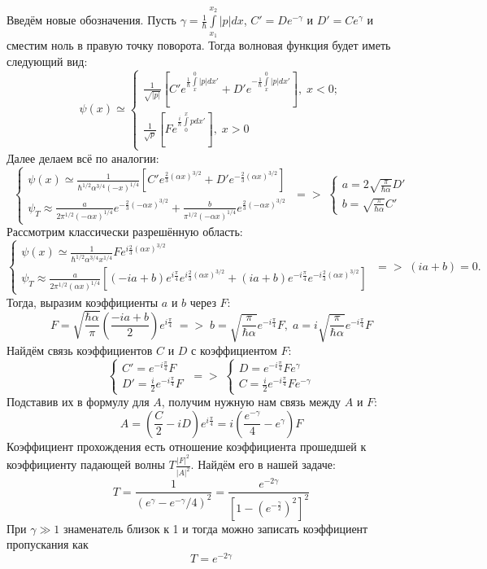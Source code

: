Введём новые обозначения. Пусть $\gamma = \frac{1}{\hbar}\int\limits_{x_1}^{x_2} |p| dx$, $C' = De^{-\gamma}$ и $D' = Ce^{\gamma}$ и сместим ноль в правую точку поворота. Тогда волновая функция будет иметь следующий вид:
\[
   \psi(x) \simeq 
   \begin{cases}
   \frac{1}{\sqrt{|p|}}\left[ C'e^{\frac{1}{\hbar}\int\limits_{x}^{0} |p| dx'} + D'e^{-\frac{1}{\hbar}\int\limits_{x}^{0} |p| dx'} \right],\; x < 0;\\
   \frac{1}{\sqrt{p}}\left[ Fe^{\frac{i}{\hbar}\int\limits_{0}^{x} p dx'} \right],\; x > 0
   \end{cases}
\]
Далее делаем всё по аналогии:
\[
\begin{cases}
    \psi(x) \simeq \frac{1}{\hbar^{1/2}\alpha^{3/4}(-x)^{1/4}}\left[ C'e^{\frac{2}{3}(\alpha x)^{3/2}} + D'e^{-\frac{2}{3}(\alpha x)^{3/2}} \right]\\
    \psi_T \approx \frac{a}{2\pi^{1/2}(-\alpha x)^{1/4}}e^{-\frac{2}{3}(-\alpha x)^{3/2}} + \frac{b}{\pi^{1/2}(-\alpha x)^{1/4}}e^{\frac{2}{3}(-\alpha x)^{3/2}}
\end{cases}
 \; => \;
 \begin{cases}
     a = 2\sqrt{\frac{\pi}{\hbar\alpha}}D'\\
     b = \sqrt{\frac{\pi}{\hbar\alpha}}C'
 \end{cases}
\]
Рассмотрим классически разрешённую область:
\[
\begin{cases}
    \psi(x) \simeq \frac{1}{\hbar^{1/2}\alpha^{3/4}x^{1/4}}Fe^{i\frac{2}{3}(\alpha x)^{3/2}}\\
    \psi_T \approx \frac{a}{2\pi^{1/2}(\alpha x)^{1/4}}\left[ (-ia + b)e^{i\frac{\pi}{4}}e^{i\frac{2}{3}(\alpha x)^{3/2}} + (ia+b)e^{-i\frac{\pi}{4}}e^{-i\frac{2}{3}(\alpha x)^{3/2}} \right]
\end{cases}
 \; => \; (ia + b) = 0.
\]
Тогда, выразим коэффициенты $a$ и $b$ через $F$:
\[
F = \sqrt{\frac{\hbar\alpha}{\pi}}\left( \frac{-ia + b}{2} \right)e^{i\frac{\pi}{4}}\; => \; b = \sqrt{\frac{\pi}{\hbar\alpha}} e^{-i\frac{\pi}{4}}F, \; a = i\sqrt{\frac{\pi}{\hbar\alpha}} e^{-i\frac{\pi}{4}}F
\]
Найдём связь коэффициентов $C$ и $D$ с коэффициентом $F$:
\[
\begin{cases}
    C' = e^{-i\frac{\pi}{4}}F\\
    D' = \frac{i}{2}e^{-i\frac{\pi}{4}}F
\end{cases}
\; => \;
\begin{cases}
    D = e^{-i\frac{\pi}{4}}Fe^{\gamma}\\
    C = \frac{i}{2}e^{-i\frac{\pi}{4}}Fe^{-\gamma}
\end{cases}
\]
Подставив их в формулу для $A$, получим нужную нам связь между $A$ и $F$:
\[
A = \left( \frac{C}{2} - iD \right)e^{i\frac{\pi}{4}} = i\left( \frac{e^{-\gamma}}{4} - e^{\gamma} \right)F
\]
Коэффициент прохождения есть отношение коэффициента прошедшей к коэффициенту падающей волны $T \frac{|F|^2}{|A|^2}$. Найдём его в нашей задаче:
\[
T = \frac{1}{(e^{\gamma} - e^{-\gamma}/4)^2} = \frac{e^{-2\gamma}}{[1-(e^{-\frac{\gamma}{2}})^2]^2}
\]
При $\gamma \gg 1$ знаменатель близок к 1 и тогда можно записать коэффициент пропускания как
\[
T = e^{-2\gamma}
\]


